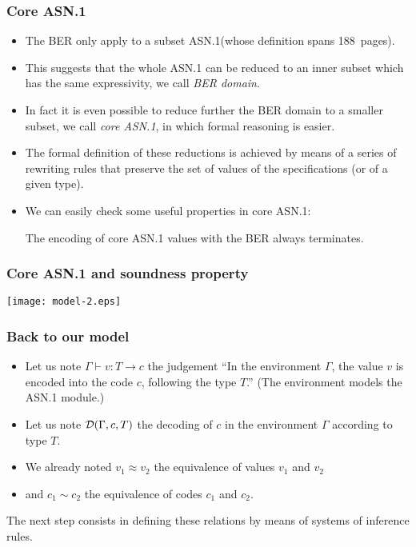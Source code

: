 \documentclass[compress,dvips,xcolor={dvipsnames},t]{beamer}
\newcommand{\coding}[4]{#1 \vdash #2 : #3 \rightarrow #4}
\newcommand{\decoding}[3]{{\cal D}(#1,#2,#3)}
\newcommand\ASN{\textsf{ASN.1}\xspace}
\newcommand{\core}{core \ASN}
\begin{document}
\begin{frame}
\frametitle{Core \ASN}

\begin{itemize}

  \item The BER only apply to a subset \ASN (whose definition spans 
  188~pages).

  \item This suggests that the whole \ASN can be reduced to an inner
  subset which has the same expressivity, we call \emph{BER domain}.

  \item In fact it is even possible to reduce further the BER domain
  to a smaller subset, we call \emph{\core}, in which formal
  reasoning is easier.

  \item The formal definition of these reductions is achieved by means
  of a series of rewriting rules that preserve the set of values of
  the specifications (or of a given type).

  \item We can easily check some useful properties in \core:
  \begin{theorem}
    The encoding of \core values with the BER always terminates.
  \end{theorem}

\end{itemize}

\end{frame}

\begin{frame}
\frametitle{Core \ASN and soundness property}

\centerline{\texttt{[image: model-2.eps]}}

\end{frame}

\begin{frame}
\frametitle{Back to our model}

\begin{itemize}

  \item Let us note $\coding{\Gamma}{v}{T}{c}$ the judgement ``In the
    environment $\Gamma$, the value $v$ is encoded into the code $c$,
    following the type $T$.''  (The environment models the \ASN
    module.)

  \item Let us note $\decoding{\Gamma}{c}{T}$ the decoding of $c$ in
    the environment $\Gamma$ according to type $T$.

  \item We already noted $v_1 \approx v_2$ the equivalence of values
    $v_1$ and $v_2$

  \item and $c_1 \sim c_2$ the equivalence of codes $c_1$ and $c_2$.

\end{itemize}

The next step consists in defining these relations by means of systems
of inference rules.

\end{frame}
\end{document}
